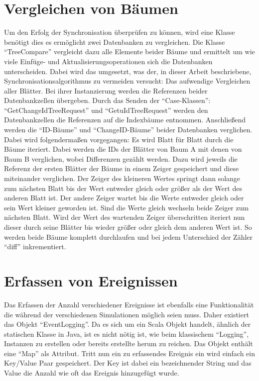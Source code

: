 \documentclass[a4paper,11pt,oneside,%
headsepline,												%
footsepline,												%
bibtotocnumbered									%
]{scrreprt}
\begin{document}
\section{Vergleichen von Bäumen}
\label{sec:DiffTrees}
Um den Erfolg der Synchronisation überprüfen zu können, wird eine Klasse benötigt dies es ermöglicht zwei Datenbanken zu vergleichen. Die Klasse \enquote{TreeCompare} vergleicht dazu alle Elemente beider Bäume und ermittelt um wie viele Einfüge- und Aktualisierungsoperationen sich die Datenbanken unterscheiden. Dabei wird das umgesetzt, was der, in dieser Arbeit beschriebene, Synchronisationsalgorithmus zu vermeiden versucht: Das aufwendige Vergleichen aller Blätter. Bei ihrer Instanzierung werden die Referenzen beider Datenbankzellen übergeben. Durch das Senden der \enquote{Case-Klassen}: \enquote{GetChangeIdTreeRequest} und \enquote{GetuIdTreeRequest} werden den Datenbankzellen die Referenzen auf die Indexbäume entnommen. Anschließend werden die  \enquote{ID-Bäume} und \enquote{ChangeID-Bäume} beider Datenbanken verglichen. Dabei wird folgendermaßen vorgegangen: Es wird Blatt für Blatt durch die Bäume iteriert. Dabei werden die IDs der Blätter von Baum A mit denen von Baum B verglichen, wobei Differenzen gezählt werden. Dazu wird jeweils die Referenz der ersten Blätter der Bäume in einem Zeiger gespeichert und diese miteinander verglichen. Der Zeiger des kleineren Wertes springt dann solange zum nächsten Blatt bis der Wert entweder gleich oder größer als der Wert des anderen Blatt ist. Der andere Zeiger wartet bis die Werte entweder gleich oder sein Wert kleiner geworden ist. Sind die Werte gleich wechseln beide Zeiger zum nächsten Blatt. Wird der Wert des wartenden Zeiger überschritten iteriert nun dieser durch seine Blätter bis wieder größer oder gleich dem anderen Wert ist. So werden beide Bäume komplett durchlaufen und bei jedem Unterschied der Zähler \enquote{diff} inkrementiert. 

\section{Erfassen von Ereignissen}
Das Erfassen der Anzahl verschiedener Ereignisse ist ebenfalls eine Funktionalität die während der verschiedenen Simulationen möglich seien muss. Daher existiert das Objekt \enquote{EventLogging}. Da es sich um ein Scala Objekt handelt, ähnlich der statischen Klasse in Java, ist es nicht nötig ist, wie beim klassischem \enquote{Logging}, Instanzen zu erstellen oder bereits erstellte herum zu reichen. Das Objekt enthält eine \enquote{Map} als Attribut. Tritt nun ein zu erfassendes Ereignis ein wird einfach ein Key/Value Paar gespeichert. Der Key ist dabei ein bezeichnender String und das Value die Anzahl wie oft das Ereignis hinzugefügt wurde.
\end{document}
